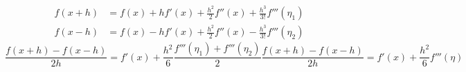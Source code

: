 \documentclass[12pt]{article}
\begin{document}
\begin{equation}
\label{eq:expansions}
\begin{aligned}
f(x+h) &= f(x) + hf'(x) + \frac{h^2}{2}f''(x) + \frac{h^3}{3!}f'''(\eta_1) \\
f(x-h) &= f(x) -hf'(x) + \frac{h^2}{2}f''(x) -\frac{h^3}{3!}f'''(\eta_2)
\end{aligned}
\end{equation}
\begin{subequations}
\begin{equation}
\label{eq:first_finite}
\frac{f(x+h)-f(x-h)}{2h} = f'(x) + \frac{h^2}{6}\frac{f'''(\eta_1)+f'''(\eta_2)}{2}
\end{equation}
\begin{equation}
\label{eq:second_finite}
\frac{f(x+h)-f(x-h)}{2h} = f'(x) + \frac{h^2}{6}f'''(\eta)
\end{equation}
\end{subequations}
\end{document}

